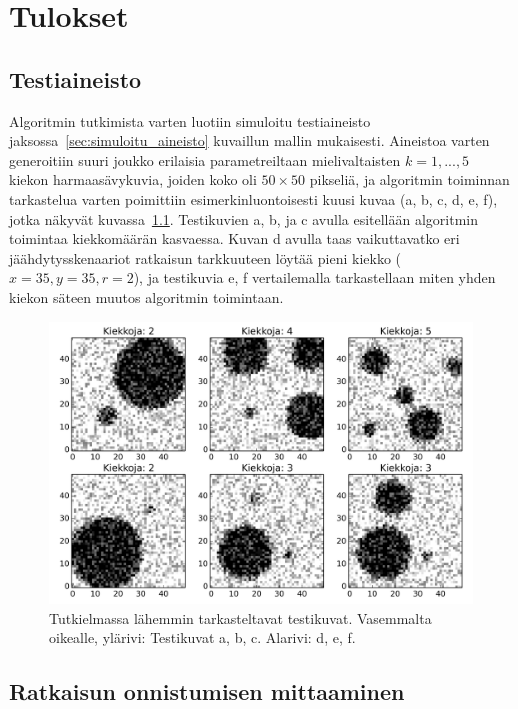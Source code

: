 \chapter{Tulokset}
\label{cha:tulokset}

\section{Testiaineisto}
\label{sec:testiaineisto}

Algoritmin tutkimista varten luotiin simuloitu testiaineisto jaksossa~\ref{sec:simuloitu_aineisto} kuvaillun mallin mukaisesti.
Aineistoa varten generoitiin suuri joukko erilaisia parametreiltaan mielivaltaisten $k = 1, ..., 5$ kiekon harmaasävykuvia,
joiden koko oli $50 \times 50$ pikseliä,
ja algoritmin toiminnan tarkastelua varten poimittiin esimerkinluontoisesti kuusi kuvaa (a, b, c, d, e, f), jotka näkyvät kuvassa~\ref{fig:all_datasets}.
Testikuvien a, b, ja c avulla esitellään algoritmin toimintaa kiekkomäärän kasvaessa.
Kuvan d avulla taas vaikuttavatko eri jäähdytysskenaariot ratkaisun tarkkuuteen löytää pieni kiekko ($x = 35, y = 35, r = 2$),
ja testikuvia e, f vertailemalla tarkastellaan miten yhden kiekon säteen muutos algoritmin toimintaan.

\begin{figure}[htb]
    \centering
    \includegraphics[width=\linewidth]{figures/all_datasets.png}
    \caption{Tutkielmassa lähemmin tarkasteltavat testikuvat.
        Vasemmalta oikealle, ylärivi: Testikuvat a, b, c.
        Alarivi: d, e, f.
    \label{fig:all_datasets}}
\end{figure}

\section{Ratkaisun onnistumisen mittaaminen}
\label{sec:ratkaisun_onnistumisen_mittaaminen}

